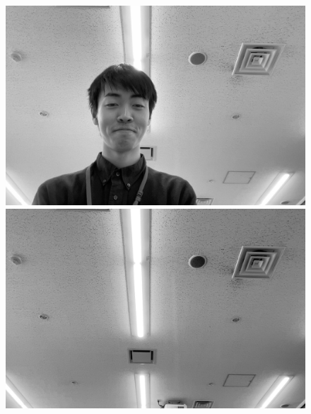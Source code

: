 \begin{figure}[H]
    \begin{minipage}[b]{.49\textwidth}
        \centering
        \begin{minipage}[b]{.3\textwidth}
            \centering
            \includegraphics[keepaspectratio,width=\textwidth]{../../05_UnderstandingImages/fig1_g.jpg}
        \end{minipage}
        \begin{minipage}[b]{.3\textwidth}
            \centering
            \includegraphics[keepaspectratio,width=\textwidth]{../../05_UnderstandingImages/fig2_g.jpg}
        \end{minipage}
        \begin{minipage}[b]{.3\textwidth}
            \centering

\end{minipage}
\end{minipage}
\end{figure}
